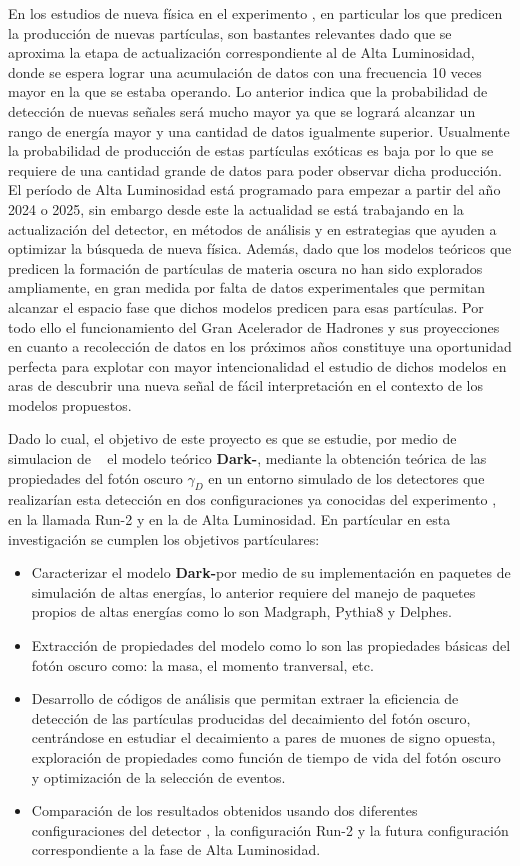En los estudios de nueva física en el experimento \LHC, en particular los que predicen la producción de nuevas partículas, son bastantes relevantes dado que se aproxima la etapa de actualización correspondiente al de Alta Luminosidad, donde se espera lograr una acumulación de datos con una frecuencia 10 veces mayor en la que se estaba operando. Lo anterior indica que la probabilidad de detección de nuevas señales será mucho mayor ya que se logrará alcanzar un rango de energía mayor y una cantidad de datos igualmente superior. Usualmente la probabilidad de producción de estas partículas exóticas es baja por lo que se requiere de una cantidad grande de datos para poder observar dicha producción. El período de Alta Luminosidad está programado para empezar a partir del año 2024 o 2025, sin embargo desde este la actualidad se está trabajando en la actualización del detector, en métodos de análisis y en estrategias que ayuden a optimizar la búsqueda de nueva física. Además, dado que los modelos teóricos que predicen la formación de partículas de materia oscura no han sido explorados ampliamente, en gran medida por falta de datos experimentales que permitan alcanzar el espacio fase que dichos modelos predicen para esas partículas. Por todo ello el funcionamiento del Gran Acelerador de Hadrones y sus proyecciones en cuanto a recolección de datos en los próximos años constituye una oportunidad perfecta para explotar con mayor intencionalidad el estudio de dichos modelos en aras de descubrir una nueva señal de fácil interpretación en el contexto de los modelos propuestos. 

Dado lo cual, el objetivo de este proyecto es que se estudie, por medio de simulacion de \MC ~ el modelo teórico \textbf{Dark-}\SUSY, mediante la obtención teórica de las propiedades del fotón oscuro $\gamma_D$ en un entorno  simulado de los detectores que realizarían esta detección en dos  configuraciones ya conocidas del experimento \CMS, en la llamada Run-2 y en la  de Alta Luminosidad. En partícular en esta investigación se cumplen los objetivos partículares:
\begin{itemize}
\item Caracterizar el modelo \textbf{Dark-}\SUSY por medio de su implementación en paquetes de simulación de altas energías, lo anterior requiere del manejo de paquetes propios de altas energías como lo son Madgraph, Pythia8 y Delphes.
\item Extracción de propiedades del modelo como lo son las propiedades básicas del fotón oscuro como: la masa, el momento tranversal, etc.
\item Desarrollo de códigos de análisis que permitan extraer la eficiencia de detección de las partículas producidas del decaimiento del fotón oscuro, centrándose en estudiar el decaimiento a pares de muones de signo opuesta, exploración de propiedades como función de tiempo de vida del fotón oscuro y optimización de la selección de eventos.
\item Comparación de los resultados obtenidos usando dos diferentes configuraciones del detector \CMS, la configuración Run-2 y la futura configuración correspondiente a la fase de Alta Luminosidad.
\end{itemize}


